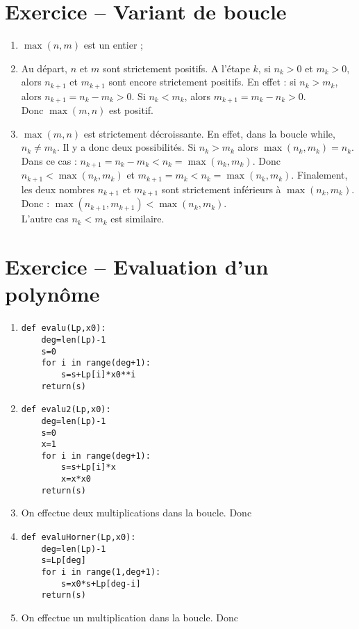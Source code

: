 \section{Exercice -- Variant de boucle}
\begin{enumerate}
\item $\max(n,m)$ est un entier ;
\item Au départ, $n$ et $m$ sont strictement positifs. A l'étape $k$,  si $n_k>0$ et $m_k>0$, alors $n_{k+1}$ et $m_{k+1}$ sont encore strictement positifs. En effet : si $n_k>m_k$, alors $n_{k+1}=n_k-m_k > 0$. Si $n_k<m_k$, alors $m_{k+1}=m_k-n_k > 0$. \\
Donc $\max (m,n)$ est positif.
\item $\max(m,n)$ est strictement décroissante. En effet, dans la boucle while, $n_k\neq m_k$. Il y a donc deux possibilités. Si $n_k>m_k$ alors $\max(n_k,m_k)=n_k$. Dans ce cas : $n_{k+1}=n_k-m_k<n_k=\max(n_k,m_k)$. Donc $n_{k+1}<\max(n_k,m_k)$ et $m_{k+1}=m_k<n_k=\max(n_k,m_k)$. Finalement, les deux nombres $n_{k+1}$ et $m_{k+1}$ sont strictement inférieurs à $\max(n_k,m_k)$. Donc : $\max(n_{k+1},m_{k+1})<\max(n_k,m_k)$.\\
L'autre cas $n_k<m_k$ est similaire.\\
\end{enumerate}


\section{Exercice -- Evaluation d'un polynôme}
\begin{enumerate}
\item 
\begin{verbatim}
def evalu(Lp,x0):
    deg=len(Lp)-1
    s=0
    for i in range(deg+1):
        s=s+Lp[i]*x0**i
    return(s) 
\end{verbatim}
\item 
\begin{verbatim}
def evalu2(Lp,x0):
    deg=len(Lp)-1
    s=0
    x=1
    for i in range(deg+1):
        s=s+Lp[i]*x
        x=x*x0
    return(s)
\end{verbatim}
\item On effectue deux multiplications dans la boucle. Donc 
\item 
\begin{verbatim}
def evaluHorner(Lp,x0):
    deg=len(Lp)-1
    s=Lp[deg]
    for i in range(1,deg+1):
        s=x0*s+Lp[deg-i]
    return(s)
\end{verbatim}
\item On effectue un multiplication dans la boucle. Donc 
\end{enumerate}






    


